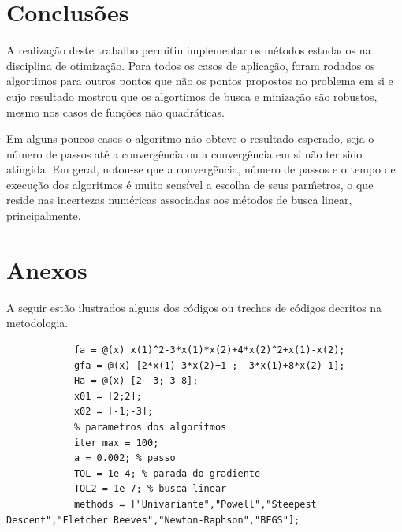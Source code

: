 \documentclass[10pt, a4paper]{article}
\begin{document}
\section{Conclus\~oes}

A realiza\c c\~ao deste trabalho permitiu implementar os m\'etodos estudados na disciplina de otimiza\c c\~ao. Para todos os casos de aplica\c c\~ao, foram rodados os algortimos para outros pontos que n\~ao os pontos propostos no problema em si e cujo resultado mostrou que os algortimos de busca e miniza\c c\~ao s\~ao robustos, mesmo nos casos de fun\c c\~oes n\~ao quadr\'aticas.

Em alguns poucos casos o algoritmo n\~ao obteve o resultado esperado, seja o n\'umero de passos at\'e a converg\^encia ou a converg\^encia em si n\~ao ter sido atingida. Em geral, notou-se que a converg\^encia, n\'umero de passos e o tempo de execu\c c\~ao dos algoritmos \'e muito sens\'ivel a escolha de seus par\^metros, o que reside nas incertezas num\'ericas associadas aos m\'etodos de busca linear, principalmente.

\section{Anexos}

A seguir est\~ao ilustrados alguns dos c\'odigos ou trechos de c\'odigos decritos na metodologia.

\begin{minipage}{\linewidth}
      \begin{lstlisting}[style=myStyle, caption=script t01.m setando par\^ametros e criando as fun\c c\~oes, label=l1]
            % dados do item 01a, f, grad f, hess f e x0
            fa = @(x) x(1)^2-3*x(1)*x(2)+4*x(2)^2+x(1)-x(2);
            gfa = @(x) [2*x(1)-3*x(2)+1 ; -3*x(1)+8*x(2)-1];
            Ha = @(x) [2 -3;-3 8];
            x01 = [2;2];
            x02 = [-1;-3];
            % parametros dos algoritmos
            iter_max = 100;
            a = 0.002; % passo
            TOL = 1e-4; % parada do gradiente
            TOL2 = 1e-7; % busca linear
            methods = ["Univariante","Powell","Steepest Descent","Fletcher Reeves","Newton-Raphson","BFGS"];
      \end{lstlisting}
\end{minipage}
\end{document}

